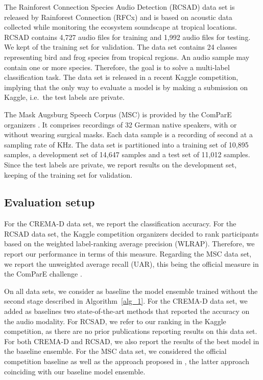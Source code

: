 \documentclass[a4paper]{article}
\begin{document}
The Rainforest Connection Species Audio Detection (RCSAD) data set \cite{RFCx} is released by Rainforest Connection (RFCx) and is based on acoustic data collected while monitoring the ecosystem soundscape at tropical locations. RCSAD contains 4,727 audio files for training and 1,992 audio files for testing. We kept  of the training set for validation.
The data set contains 24 classes representing bird and frog species from tropical regions. An audio sample may contain one or more species. Therefore, the goal is to solve a multi-label classification task. The data set is released in a recent Kaggle competition, implying that the only way to evaluate a model is by making a submission on Kaggle, i.e.~the test labels are private.

The Mask Augsburg Speech Corpus (MSC) is provided by the ComParE organizers \cite{Schuller-INTERSPEECH-2020}. It comprises recordings of 32 German native speakers, with or without wearing surgical masks. Each data sample is a recording of  second at a sampling rate of  KHz. The data set is partitioned into a training set of 10,895 samples, a development set of 14,647 samples and a test set of 11,012 samples. Since the test labels are private, we report results on the development set, keeping  of the training set for validation.

\vspace{-0.1cm}
\subsection{Evaluation setup}
\vspace{-0.1cm}

For the CREMA-D data set, we report the classification accuracy. For the RCSAD data set, the Kaggle competition organizers decided to rank participants based on the weighted label-ranking average precision (WLRAP). Therefore, we report our performance in terms of this measure. Regarding the MSC data set, we report the unweighted average recall (UAR), this being the official measure in the ComParE challenge \cite{Schuller-INTERSPEECH-2020}. 

On all data sets, we consider as baseline the model ensemble trained without the second stage described in Algorithm~\ref{alg_1}. For the CREMA-D data set, we added as baselines two state-of-the-art methods \cite{Shukla-ICASSP-2020, He-CVPRW-2020} that reported the accuracy on the audio modality. For RCSAD, we refer to our ranking in the Kaggle competition, as there are no prior publications reporting results on this data set. For both CREMA-D and RCSAD, we also report the results of the best model in the baseline ensemble. For the MSC data set, we considered the official competition baseline as well as the approach proposed in \cite{ristea2020you}, the latter approach coinciding with our baseline model ensemble.
\end{document}
